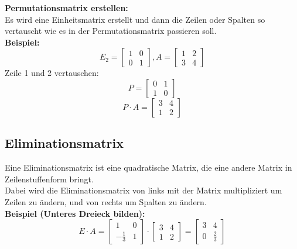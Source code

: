 \documentclass[12pt,a4paper]{article}
\begin{document}
\textbf{Permutationsmatrix erstellen:} \\
Es wird eine Einheitsmatrix erstellt und dann die Zeilen oder Spalten so vertauscht wie es in der Permutationsmatrix passieren soll. \\
\textbf{Beispiel:}
\[
E_2 =
\begin{bmatrix}
1 & 0 \\
0 & 1
\end{bmatrix}
,A =
\begin{bmatrix}
    1 & 2 \\
    3 & 4
\end{bmatrix}
\]
Zeile 1 und 2 vertauschen:
\[
P =
\begin{bmatrix}
0 & 1 \\
1 & 0
\end{bmatrix}
\]
\[
P \cdot A = 
\begin{bmatrix}
    3 & 4 \\
    1 & 2
\end{bmatrix}
\]


\subsection{Eliminationsmatrix}
Eine Eliminationsmatrix ist eine quadratische Matrix, die eine andere Matrix in Zeilenstuffenform bringt. \\
Dabei wird die Eliminationsmatrix von links mit der Matrix multipliziert um Zeilen zu ändern, und von rechts um Spalten zu ändern. \\
\textbf{Beispiel (Unteres Dreieck bilden):}
\[
E \cdot A
=
\begin{bmatrix}
1 & 0 \\
-\frac{1}{3} & 1
\end{bmatrix}
\cdot
\begin{bmatrix}
3 & 4 \\
1 & 2
\end{bmatrix}
=
\begin{bmatrix}
3 & 4 \\
0 & \frac{2}{3}
\end{bmatrix}
\]
\end{document}
